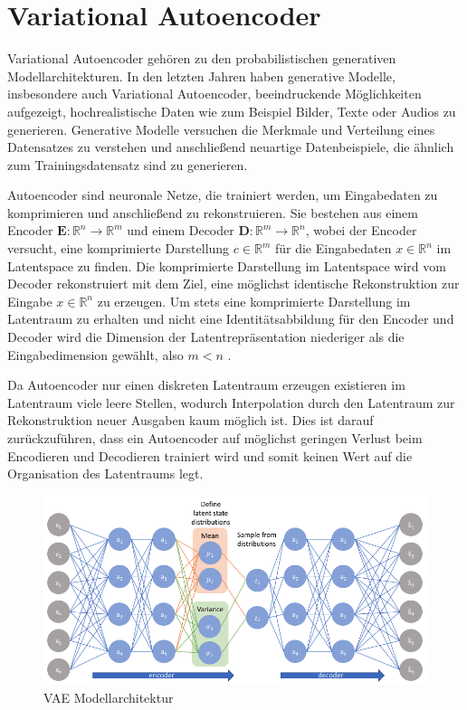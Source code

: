 \section{Variational Autoencoder}\raggedbottom
\label{vae}
Variational Autoencoder \citep{kingma2014autoencoding} gehören zu den probabilistischen generativen Modellarchitekturen. In den letzten Jahren haben generative Modelle, insbesondere auch Variational Autoencoder, beeindruckende Möglichkeiten aufgezeigt, hochrealistische Daten wie zum Beispiel Bilder, Texte oder Audios zu generieren.
Generative Modelle versuchen die Merkmale und Verteilung eines Datensatzes zu verstehen und anschließend neuartige Datenbeispiele, die ähnlich zum Trainingsdatensatz sind zu generieren.

Autoencoder sind neuronale Netze, die trainiert werden, um Eingabedaten zu komprimieren und anschließend zu rekonstruieren. 
Sie bestehen aus einem Encoder $\mathbf{E}:\mathbb{R}^n \rightarrow \mathbb{R}^m$ und einem Decoder $\mathbf{D}:\mathbb{R}^m \rightarrow \mathbb{R}^n$, wobei der Encoder versucht, eine komprimierte Darstellung $c \in \mathbb{R}^{m}$ für die Eingabedaten $x \in \mathbb{R}^{n}$ im Latentspace zu finden. Die komprimierte Darstellung im Latentspace wird vom Decoder rekonstruiert mit dem Ziel, eine möglichst identische Rekonstruktion zur Eingabe $x \in \mathbb{R}^{n}$ zu erzeugen.
Um stets eine komprimierte Darstellung im Latentraum zu erhalten und nicht eine Identitätsabbildung für den Encoder und Decoder wird die Dimension der Latentrepräsentation niederiger als die Eingabedimension gewählt, also $m<n$ \citep{introVAE}. 

Da Autoencoder nur einen diskreten Latentraum erzeugen existieren im Latentraum viele leere Stellen, wodurch Interpolation durch den Latentraum zur Rekonstruktion neuer Ausgaben kaum möglich ist.
Dies ist darauf zurückzuführen, dass ein Autoencoder auf möglichst geringen Verlust beim Encodieren und Decodieren trainiert wird und somit keinen Wert auf die Organisation des Latentraums legt. 


\begin{figure}[h]
    \centering
    \includegraphics[width=12cm]{bilder/vae}
    \caption{VAE Modellarchitektur \citep{jordan_2018}}
    \label{vae_model}
\end{figure}

